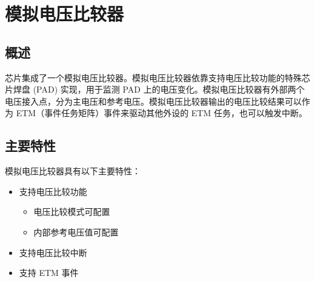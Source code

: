 \documentclass[main\_\_CN.tex]{subfiles}
\begin{document}

\ifglobal
\else
    \listoftodos
    {\let\clearpage\relax \listofdonetodos}
    \tableofcontents
\fi



\hypertarget{anacom}{}
\chapter{模拟电压比较器}
\label{mod:anacom}


\section{概述}

\chipname{} 芯片集成了一个模拟电压比较器。模拟电压比较器依靠支持电压比较功能的特殊芯片焊盘 (PAD) 实现，用于监测 PAD 上的电压变化。模拟电压比较器有外部两个电压接入点，分为主电压和参考电压。模拟电压比较器输出的电压比较结果可以作为 ETM（事件任务矩阵）事件来驱动其他外设的 ETM 任务，也可以触发中断。



\section{主要特性}
\label{sec:anacom-features}

模拟电压比较器具有以下主要特性：

\begin{itemize}
    \item 支持电压比较功能
    \begin{itemize}
        \item 电压比较模式可配置
        \item 内部参考电压值可配置
    \end{itemize}
    \item 支持电压比较中断
    \item 支持 ETM 事件
\end{itemize}


\end{document}
